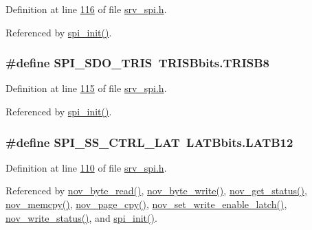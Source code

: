 Definition at line \hyperlink{a00007_source_l00116}{116} of file \hyperlink{a00007_source}{srv\+\_\+spi.\+h}.



Referenced by \hyperlink{a00026_source_l00030}{spi\+\_\+init()}.

\hypertarget{a00007_aa171067a2f57d1555ab4449c78847c72}{
\subsubsection[{S\+P\+I\+\_\+\+S\+D\+O\+\_\+\+T\+R\+I\+S}]{\setlength{\rightskip}{0pt plus 5cm}\#define S\+P\+I\+\_\+\+S\+D\+O\+\_\+\+T\+R\+I\+S~T\+R\+I\+S\+Bbits.\+T\+R\+I\+S\+B8}}\label{a00007_aa171067a2f57d1555ab4449c78847c72}


Definition at line \hyperlink{a00007_source_l00115}{115} of file \hyperlink{a00007_source}{srv\+\_\+spi.\+h}.



Referenced by \hyperlink{a00026_source_l00030}{spi\+\_\+init()}.

\hypertarget{a00007_aa8b53e04161d178ebd9c01edf1584039}{
\subsubsection[{S\+P\+I\+\_\+\+S\+S\+\_\+\+C\+T\+R\+L\+\_\+\+L\+A\+T}]{\setlength{\rightskip}{0pt plus 5cm}\#define S\+P\+I\+\_\+\+S\+S\+\_\+\+C\+T\+R\+L\+\_\+\+L\+A\+T~L\+A\+T\+Bbits.\+L\+A\+T\+B12}}\label{a00007_aa8b53e04161d178ebd9c01edf1584039}


Definition at line \hyperlink{a00007_source_l00110}{110} of file \hyperlink{a00007_source}{srv\+\_\+spi.\+h}.



Referenced by \hyperlink{a00054_source_l00630}{nov\+\_\+byte\+\_\+read()}, \hyperlink{a00054_source_l00605}{nov\+\_\+byte\+\_\+write()}, \hyperlink{a00054_source_l00564}{nov\+\_\+get\+\_\+status()}, \hyperlink{a00054_source_l00720}{nov\+\_\+memcpy()}, \hyperlink{a00054_source_l00660}{nov\+\_\+page\+\_\+cpy()}, \hyperlink{a00054_source_l00550}{nov\+\_\+set\+\_\+write\+\_\+enable\+\_\+latch()}, \hyperlink{a00054_source_l00583}{nov\+\_\+write\+\_\+status()}, and \hyperlink{a00026_source_l00030}{spi\+\_\+init()}.

